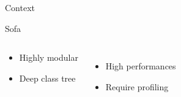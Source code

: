 \documentclass[xcolor={usenames,dvipsnames}]{beamer}
\begin{document}
\begin{frame}{Context}
\begin{exampleblock}{Sofa \citep{Allard07SOFA,Nesme09Preserving,Faure11Sparse}}
\begin{columns}
\begin{itemize}
\begin{itemize}
                        \item Highly modular
                        \item Deep class tree
                    \end{itemize}
            \end{itemize}
            \begin{itemize}
                \item<7-|alert@+-> High performances
                    \vspace{.7cm}
                \item<9-|alert@+-> Require profiling
            \end{itemize}
        \end{columns}
    \end{exampleblock}
\end{frame}
\end{document}
